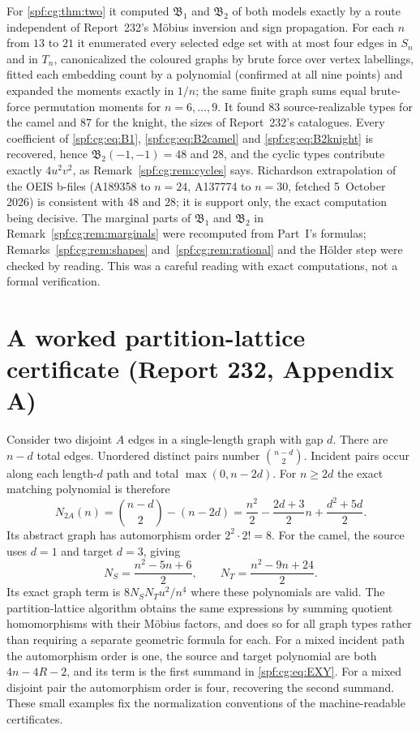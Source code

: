 \documentclass[11pt]{article}
\numberwithin{equation}{section}
\theoremstyle{definition}
\theoremstyle{remark}
\theoremstyle{definition}
\newcommand{\fall}[2]{{#1}^{\underline{#2}}}
\begin{document}
For \cref{spf:cg:thm:two} it computed $\mathfrak B_1$ and $\mathfrak B_2$
of both models exactly by a route independent of Report~232's M\"obius
inversion and sign propagation. For each $n$ from $13$ to $21$ it
enumerated every selected edge set with at most four edges in $S_n$ and in
$T_n$, canonicalized the coloured graphs by brute force over vertex
labellings, fitted each embedding count by a polynomial (confirmed at all
nine points) and expanded the moments exactly in $1/n$; the same finite
graph sums equal brute-force permutation moments for $n=6,\ldots,9$. It
found $83$ source-realizable types for the camel and $87$ for the knight,
the sizes of Report~232's catalogues. Every coefficient of
\eqref{spf:cg:eq:B1}, \eqref{spf:cg:eq:B2camel} and
\eqref{spf:cg:eq:B2knight} is recovered, hence
$\mathfrak B_2(-1,-1)=48$ and $28$, and the cyclic types contribute exactly
$4u^2v^2$, as Remark~\ref{spf:cg:rem:cycles} says. Richardson
extrapolation of the OEIS b-files (A189358 to $n=24$, A137774 to $n=30$,
fetched 5~October 2026) is consistent with $48$ and $28$; it is support
only, the exact computation being decisive. The marginal parts of
$\mathfrak B_1$ and $\mathfrak B_2$ in Remark~\ref{spf:cg:rem:marginals}
were recomputed from Part~I's formulas; Remarks~\ref{spf:cg:rem:shapes}
and~\ref{spf:cg:rem:rational} and the H\"older step were checked by
reading. This was a careful reading with exact computations, not a formal
verification.

\section{A worked partition-lattice certificate (Report 232, Appendix A)}
\label{spf:cg:app:worked}

Consider two disjoint $A$ edges in a single-length graph with gap $d$.
There are $n-d$ total edges. Unordered distinct pairs number
$\binom{n-d}{2}$. Incident pairs occur along each length-$d$ path and total
$\max(0,n-2d)$. For $n\ge2d$ the exact matching polynomial is therefore
\begin{equation}
 N_{2A}(n)=\binom{n-d}{2}-(n-2d)
 =\frac{n^2}{2}-\frac{2d+3}{2}n+\frac{d^2+5d}{2}.
 \label{spf:cg:eq:twoedges}
\end{equation}
Its abstract graph has automorphism order $2^2\cdot2!=8$. For the camel,
the source uses $d=1$ and target $d=3$, giving
\[
 N_S=\frac{n^2-5n+6}{2},\qquad
 N_T=\frac{n^2-9n+24}{2}.
\]
Its exact graph term is $8N_SN_Tu^2/\fall n4$ where these polynomials are
valid. The partition-lattice algorithm obtains the same expressions by
summing quotient homomorphisms with their M\"obius factors, and does so for
all graph types rather than requiring a separate geometric formula for each.
For a mixed incident path the automorphism order is one, the source and
target polynomial are both $4n-4R-2$, and its term is the first summand in
\eqref{spf:cg:eq:EXY}. For a mixed disjoint pair the automorphism order is
four, recovering the second summand. These small examples fix the
normalization conventions of the machine-readable certificates.
\end{document}
